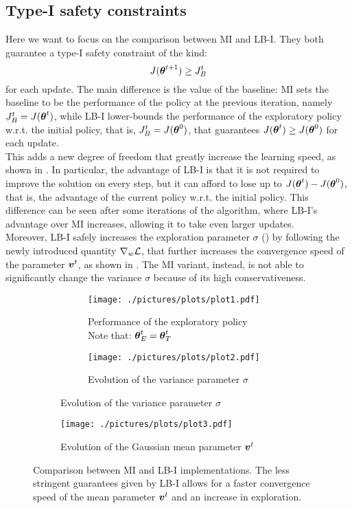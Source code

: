 \subsection{Type-I safety constraints}

Here we want to focus on the comparison between MI and LB-I. They both guarantee a type-I safety constraint of the kind:
\[
J(\vtheta^{t+1}) \geq \jbase
\]
for each update. The main difference is the value of the baseline: MI sets the baseline to be the performance of the policy at the previous iteration, namely $\jbase[t] = J(\vtheta^t)$, while LB-I lower-bounds the performance of the exploratory policy w.r.t. the initial policy, that is, $\jbase = J(\vtheta^0)$, that guarantees $J(\vtheta^t) \geq J(\vtheta^0)$ for each update.\\
This adds a new degree of freedom that greatly increase the learning speed, as shown in . In particular, the advantage of LB-I is that it is not required to improve the solution on every step, but it can afford to lose up to $J(\vtheta^t) - J(\vtheta^0)$, that is, the advantage of the current policy w.r.t. the initial policy. This difference can be seen after some iterations of the algorithm, where LB-I's advantage over MI increases, allowing it to take even larger updates.\\
Moreover, LB-I safely increases the exploration parameter $\sigma$ () by following the newly introduced quantity $\gradDelta$, that further increases the convergence speed of the parameter $\vv^t$, as shown in . The MI variant, instead, is not able to significantly change the variance $\sigma$ because of its high conservativeness. 

\begin{figure}[t]
\centering
\begin{subfigure}[t]{\textwidth}
\begin{subfigure}[t]{0.5\textwidth}
\texttt{[image: ./pictures/plots/plot1.pdf]}
\caption{Performance of the exploratory policy \\Note that: $\vtheta^t_E = \vtheta^t_T$} \label{fig:plot1-1}
\end{subfigure}
\hfill
\begin{subfigure}[t]{0.5\textwidth}
\texttt{[image: ./pictures/plots/plot2.pdf]}
\caption{Evolution of the variance parameter $\sigma$} \label{fig:plot1-2}
\end{subfigure}
\end{subfigure}
\begin{subfigure}[t]{0.5\textwidth}
\texttt{[image: ./pictures/plots/plot3.pdf]}
\caption{Evolution of the Gaussian mean parameter $\vv^t$} \label{fig:plot1-3}
\end{subfigure}
\caption[Comparison between MI and LB-I implementations.]{Comparison between MI and LB-I implementations. The less stringent guarantees given by LB-I allows for a faster convergence speed of the mean parameter $\vv^t$ and an increase in exploration. }
\label{fig:plot1}
\end{figure}

